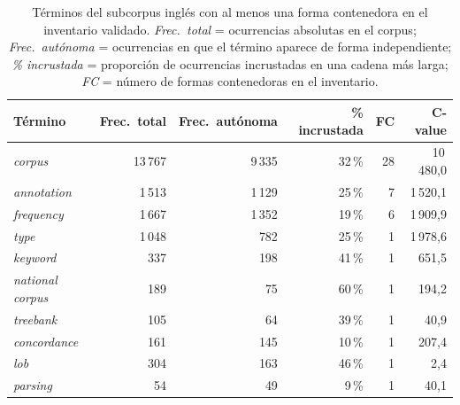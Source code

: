\begin{table}[H]
\centering
\small
\setlength{\tabcolsep}{4pt}
\renewcommand{\arraystretch}{1.15}
\caption{Términos del subcorpus inglés con al menos una forma contenedora en el inventario validado. \textit{Frec.\ total} = ocurrencias absolutas en el corpus; \textit{Frec.\ autónoma} = ocurrencias en que el término aparece de forma independiente; \textit{\% incrustada} = proporción de ocurrencias incrustadas en una cadena más larga; \textit{FC} = número de formas contenedoras en el inventario.}
\label{tab:terminos_incrustados_en}
\begin{tabular}{@{} l r r r r r @{}}
\toprule
\textbf{Término} & \textbf{Frec.\ total} & \textbf{Frec.\ autónoma} & \textbf{\% incrustada} & \textbf{FC} & \textbf{C-value} \\
\midrule
\textit{corpus}       & 13\,767 &  9\,335 & 32\,\% & 28 & 10\,480{,}0 \\
\textit{annotation}   &  1\,513 &  1\,129 & 25\,\% &  7 &  1\,520{,}1 \\
\textit{frequency}    &  1\,667 &  1\,352 & 19\,\% &  6 &  1\,909{,}9 \\
\textit{type}         &  1\,048 &    782  & 25\,\% &  1 &  1\,978{,}6 \\
\textit{keyword}      &    337  &    198  & 41\,\% &  1 &    651{,}5 \\
\textit{national corpus} & 189 &     75  & 60\,\% &  1 &    194{,}2 \\
\textit{treebank}     &    105  &     64  & 39\,\% &  1 &     40{,}9 \\
\textit{concordance}  &    161  &    145  & 10\,\% &  1 &    207{,}4 \\
\textit{lob}          &    304  &    163  & 46\,\% &  1 &      2{,}4 \\
\textit{parsing}      &     54  &     49  &  9\,\% &  1 &     40{,}1 \\
\bottomrule
\end{tabular}
\end{table}

